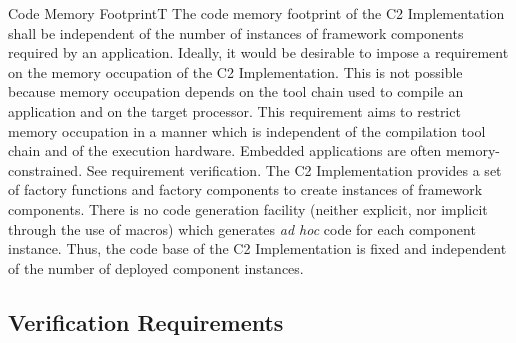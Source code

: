 \documentclass{pnp_article}
\begin{document}
\begin{fwReqNote}{Code Memory Footprint}{T}
{The code memory footprint of the C2 Implementation shall be independent of the number of instances of framework components required by an application.}
{Ideally, it would be desirable to impose a requirement on the memory occupation 
of the C2 Implementation. This is not possible because memory occupation depends on the tool chain used to compile an application and on the target processor. This requirement aims to restrict memory occupation in a manner which is independent of the compilation tool chain and of the execution hardware.}
{Embedded applications are often memory-constrained.}
{See requirement verification.} 
{The C2 Implementation provides a set of factory functions and factory components to create instances of framework components. There is no code generation facility (neither explicit, nor implicit through the use of macros) which generates \emph{ad hoc} code for each component instance. Thus, the code base of the C2 Implementation is fixed and independent of the number of deployed component instances.}
\end{fwReqNote}


\subsection{Verification Requirements}\label{req:verificationReqs}
\end{document}

